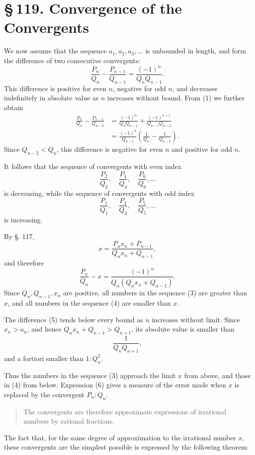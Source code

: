 \documentclass[11pt]{article}
\providecommand{\sect}[2]{\section*{\S\,#1. #2}}
\begin{document}
\sect{119}{Convergence of the Convergents}

We now assume that the sequence $a_1,a_2,a_3,\ldots$ is unbounded in length, and form the difference of two consecutive convergents:
\[
\tag{1}        \frac{P_n}{Q_n}-\frac{P_{n-1}}{Q_{n-1}}
        =\frac{(-1)^n}{Q_nQ_{n-1}}.
\]
This difference is positive for even $n$, negative for odd $n$, and decreases indefinitely in absolute value as $n$ increases without bound. From (1) we further obtain
\[
\tag{2}
\begin{aligned}
\frac{P_n}{Q_n}-\frac{P_{n-2}}{Q_{n-2}}
&=\frac{(-1)^n}{Q_nQ_{n-1}}+\frac{(-1)^{n+1}}{Q_{n-1}Q_{n-2}}\\
&=\frac{(-1)^n}{Q_{n-1}}\left(\frac1{Q_n}-\frac1{Q_{n-2}}\right).
\end{aligned}
\]
Since $Q_{n-2}<Q_n$, this difference is negative for even $n$ and positive for odd $n$.

It follows that the sequence of convergents with even index
\[
\tag{3}        \frac{P_2}{Q_2},\quad \frac{P_4}{Q_4},\quad \frac{P_6}{Q_6},\ldots
\]
is decreasing, while the sequence of convergents with odd index
\[
\tag{4}        \frac{P_1}{Q_1},\quad \frac{P_3}{Q_3},\quad \frac{P_5}{Q_5},\ldots
\]
is increasing.

By §. 117,
\[
        x=\frac{P_nx_n+P_{n-1}}{Q_nx_n+Q_{n-1}},
\]
and therefore
\[
\tag{5}        \frac{P_n}{Q_n}-x
        =\frac{(-1)^n}{Q_n(Q_nx_n+Q_{n-1})}.
\]
Since $Q_n,Q_{n-1},x_n$ are positive, all numbers in the sequence (3) are greater than $x$, and all numbers in the sequence (4) are smaller than $x$.

The difference (5) tends below every bound as $n$ increases without limit. Since $x_n>a_n$, and hence $Q_nx_n+Q_{n-1}>Q_{n+1}$, its absolute value is smaller than
\[
\tag{6}        \frac1{Q_nQ_{n+1}},
\]
and a fortiori smaller than $1:Q_n^2$.

Thus the numbers in the sequence (3) approach the limit $x$ from above, and those in (4) from below. Expression (6) gives a measure of the error made when $x$ is replaced by the convergent $P_n:Q_n$.

\begin{quote}
The convergents are therefore approximate expressions of irrational numbers by rational fractions.
\end{quote}

The fact that, for the same degree of approximation to the irrational number $x$, these convergents are the simplest possible is expressed by the following theorem:
\end{document}
